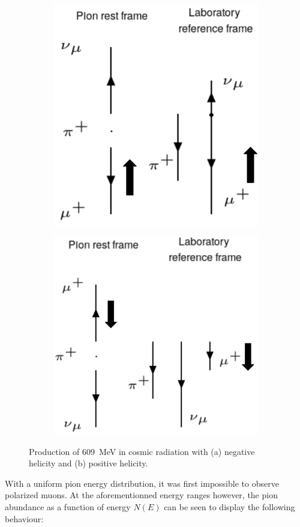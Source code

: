 \begin{figure}[htbp]
  \centering
   \begin{subfigure}[t]{0.49\linewidth}
  \centering
   \includegraphics[width=0.7\linewidth]{./fig/spindecaa.png}
  \caption{}
\label{sfig:spindeca}
  \end{subfigure}
 \begin{subfigure}[t]{0.49\linewidth}
  \centering
   \includegraphics[width=0.7\linewidth]{./fig/spindecbb.png}
  \caption{}
  \label{sfig:spindecb}
  \end{subfigure}
  \caption{Production of \SI{609}{\MeV} in cosmic radiation with (a) negative helicity and (b) positive helicity.}%
  \label{fig:spindec}
\end{figure}

With a uniform pion energy distribution, it was first impossible to observe polarized muons. At the aforementionned energy ranges however, the pion abundance as a function of energy $N(E)$ can be seen to display the following behaviour:

